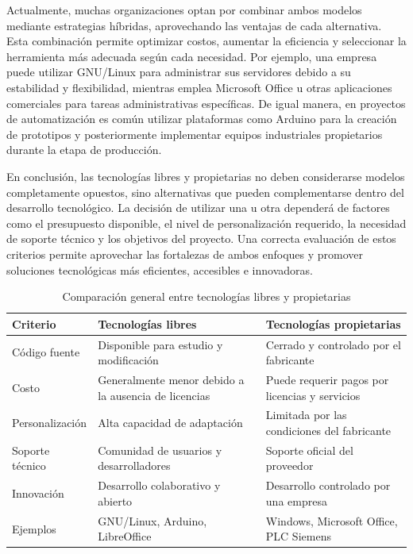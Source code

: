 \documentclass[12pt]{article}
\begin{document}
	Actualmente, muchas organizaciones optan por combinar ambos modelos mediante estrategias híbridas, aprovechando las ventajas de cada alternativa. Esta combinación permite optimizar costos, aumentar la eficiencia y seleccionar la herramienta más adecuada según cada necesidad. Por ejemplo, una empresa puede utilizar GNU/Linux para administrar sus servidores debido a su estabilidad y flexibilidad, mientras emplea Microsoft Office u otras aplicaciones comerciales para tareas administrativas específicas. De igual manera, en proyectos de automatización es común utilizar plataformas como Arduino para la creación de prototipos y posteriormente implementar equipos industriales propietarios durante la etapa de producción.
	
	En conclusión, las tecnologías libres y propietarias no deben considerarse modelos completamente opuestos, sino alternativas que pueden complementarse dentro del desarrollo tecnológico. La decisión de utilizar una u otra dependerá de factores como el presupuesto disponible, el nivel de personalización requerido, la necesidad de soporte técnico y los objetivos del proyecto. Una correcta evaluación de estos criterios permite aprovechar las fortalezas de ambos enfoques y promover soluciones tecnológicas más eficientes, accesibles e innovadoras.
	\begin{table}[H]
		\centering
		\caption{Comparación general entre tecnologías libres y propietarias}
		\begin{tabular}{|p{4cm}|p{5cm}|p{5cm}|}
			\hline
			\textbf{Criterio} & \textbf{Tecnologías libres} & \textbf{Tecnologías propietarias} \\ 
			\hline
			Código fuente & Disponible para estudio y modificación & Cerrado y controlado por el fabricante \\
			\hline
			Costo & Generalmente menor debido a la ausencia de licencias & Puede requerir pagos por licencias y servicios \\
			\hline
			Personalización & Alta capacidad de adaptación & Limitada por las condiciones del fabricante \\
			\hline
			Soporte técnico & Comunidad de usuarios y desarrolladores & Soporte oficial del proveedor \\
			\hline
			Innovación & Desarrollo colaborativo y abierto & Desarrollo controlado por una empresa \\
			\hline
			Ejemplos & GNU/Linux, Arduino, LibreOffice & Windows, Microsoft Office, PLC Siemens \\
			\hline
		\end{tabular}
	\end{table}
	
\end{document}
